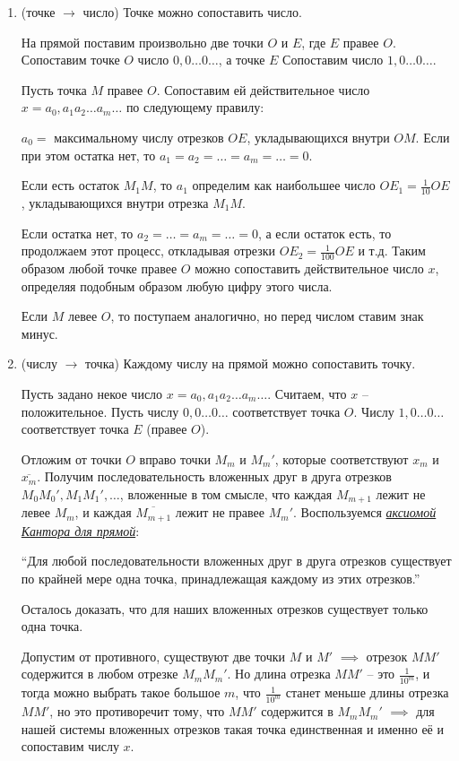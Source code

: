 \documentclass{article}
\begin{document}
\begin{enumerate}
    \item (точке $\rightarrow$ число) Точке можно сопоставить число.

    На прямой поставим произвольно две точки $O$ и $E$, где $E$ правее $O$.
    Сопоставим точке $O$ число $0,0 \dots 0 \dots$, а точке $E$
    Сопоставим число $1,0 \dots 0 \dots$.
    
    Пусть точка $M$ правее $O$. Сопоставим ей действительное число
    $x = a_0,a_1 a_2 \dots a_m \dots$ по следующему правилу:
    
    $a_0 = $ максимальному числу отрезков $OE$, укладывающихся внутри $OM$.
    Если при этом остатка нет, то $a_1 = a_2 = \dots = a_m = \dots = 0$.
    
    Если есть остаток $M_1M$, то $a_1$ определим как наибольшее число
    $OE_1 = \frac{1}{10}OE$, укладывающихся внутри отрезка $M_1M$.
    
    Если остатка нет, то $a_2 = \dots = a_m = \dots = 0$, а если остаток есть,
    то продолжаем этот процесс, откладывая отрезки $OE_2 = \frac{1}{100}OE$ 
    и т.д. Таким образом любой точке правее $O$ можно сопоставить действительное
    число $x$, определяя подобным образом любую цифру этого числа.
    
    Если $M$ левее $O$, то поступаем аналогично, но перед числом ставим знак минус.

    \item (числу $\rightarrow$ точка) Каждому числу на прямой можно сопоставить точку.

    Пусть задано некое число $x = a_0,a_1 a_2 \dots a_m \dots$. Считаем, что
    $x$ -- положительное. Пусть числу $0,0 \dots 0 \dots$ соответствует точка $O$.
    Числу $1,0 \dots 0 \dots$ соответствует точка $E$ (правее $O$).
    
    Отложим от точки $O$ вправо точки $M_m$ и $M_m'$, которые соответствуют
    $x_m$ и $\overline{x_m}$. Получим последовательность вложенных друг в друга
    отрезков $M_0M_0', M_1M_1', \dots$, вложенные в том смысле, что каждая
    $M_{m+1}$ лежит не левее $M_m$, и каждая $\overline{M_{m+1}}$ лежит
    не правее $M_m'$. Воспользуемся \underline{\textit{аксиомой Кантора для прямой}}:
    
    ``Для любой последовательности вложенных друг в друга отрезков существует
    по крайней мере одна точка, принадлежащая каждому из этих отрезков.''
    
    Осталось доказать, что для наших вложенных отрезков существует только одна точка.
    
    Допустим от противного, существуют две точки $M$ и $M'$ $\implies$ отрезок
    $MM'$ содержится в любом отрезке $M_mM_m'$. Но длина отрезка $MM'$ -- это
    $\frac{1}{10^m}$, и тогда можно выбрать такое большое $m$, что $\frac{1}{10^m}$
    станет меньше длины отрезка $MM'$, но это противоречит тому, что $MM'$ содержится в
    $M_mM_m'$ $\implies$ для нашей системы вложенных отрезков такая точка единственная и
    именно её и сопоставим числу $x$.
\end{enumerate}
\end{document}
